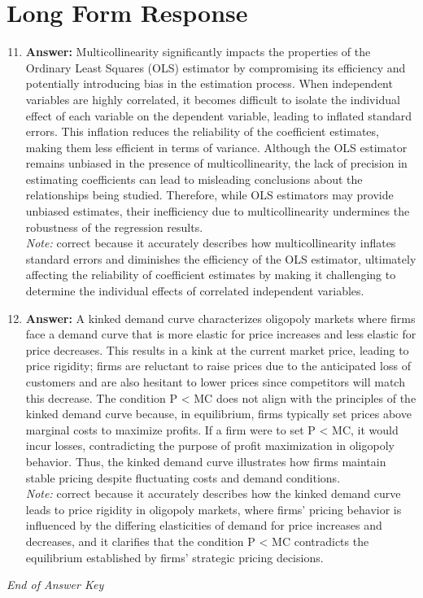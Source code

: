 \documentclass[12pt]{article}
\begin{document}
\section*{Long Form Response}
\begin{enumerate}[label=\arabic*.]
\setcounter{enumi}{10}
\item \textbf{Answer:} Multicollinearity significantly impacts the properties of the Ordinary Least Squares (OLS) estimator by compromising its efficiency and potentially introducing bias in the estimation process. When independent variables are highly correlated, it becomes difficult to isolate the individual effect of each variable on the dependent variable, leading to inflated standard errors. This inflation reduces the reliability of the coefficient estimates, making them less efficient in terms of variance. Although the OLS estimator remains unbiased in the presence of multicollinearity, the lack of precision in estimating coefficients can lead to misleading conclusions about the relationships being studied. Therefore, while OLS estimators may provide unbiased estimates, their inefficiency due to multicollinearity undermines the robustness of the regression results.
\\ \textit{Note:} correct because it accurately describes how multicollinearity inflates standard errors and diminishes the efficiency of the OLS estimator, ultimately affecting the reliability of coefficient estimates by making it challenging to determine the individual effects of correlated independent variables.
\item \textbf{Answer:} A kinked demand curve characterizes oligopoly markets where firms face a demand curve that is more elastic for price increases and less elastic for price decreases. This results in a kink at the current market price, leading to price rigidity; firms are reluctant to raise prices due to the anticipated loss of customers and are also hesitant to lower prices since competitors will match this decrease. The condition P \textless{} MC does not align with the principles of the kinked demand curve because, in equilibrium, firms typically set prices above marginal costs to maximize profits. If a firm were to set P \textless{} MC, it would incur losses, contradicting the purpose of profit maximization in oligopoly behavior. Thus, the kinked demand curve illustrates how firms maintain stable pricing despite fluctuating costs and demand conditions.
\\ \textit{Note:} correct because it accurately describes how the kinked demand curve leads to price rigidity in oligopoly markets, where firms' pricing behavior is influenced by the differing elasticities of demand for price increases and decreases, and it clarifies that the condition P \textless{} MC contradicts the equilibrium established by firms' strategic pricing decisions.
\end{enumerate}

\vfill
\noindent\textit{End of Answer Key}
\end{document}

